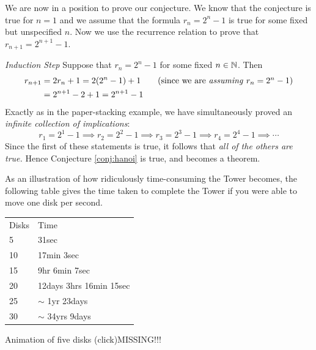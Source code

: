 We are now in a position to prove our conjecture. We know that the conjecture is true for $n=1$ and we assume that the formula $r_n=2^n-1$ is true for some fixed but unspecified $n$. Now we use the recurrence relation to prove that $r_{n+1}=2^{n+1}-1$.\smallbreak

\emph{Induction Step} Suppose that $r_n=2^n-1$ for some fixed $n\in\mathbb{N}$. Then
\begin{align*}
	r_{n+1}&=2r_n+1=2(2^n-1)+1\tag*{(since we are \emph{assuming} $r_n=2^n-1$)}\\
	&=2^{n+1}-2+1=2^{n+1}-1
\end{align*}
Exactly as in the paper-stacking example, we have simultaneously proved an \emph{infinite collection of implications}:
\[
	r_1=2^1-1\implies r_2=2^2-1\implies r_3=2^3-1\implies r_4=2^4-1\implies \cdots
\]
Since the first of these statements is true, it follows that \emph{all of the others are true.} Hence Conjecture \ref{conj:hanoi} is true, and becomes a theorem.\par

As an illustration of how ridiculously time-consuming the Tower becomes, the following table gives the time taken to complete the Tower if you were able to move one disk per second.

\begin{center}
	\begin{minipage}{0.4\textwidth}
		\begin{tabular}{ll}
			Disks&Time\\
			5&31sec\\
			10&17min 3sec\\
			15&9hr 6min 7sec\\
			20&12days 3hrs 16min 15sec\\
			25&$\sim$ 1yr 23days\\
			30&$\sim$ 34yrs 9days
		\end{tabular}
	\end{minipage}
	\begin{minipage}{0.55\textwidth}
	\centering

Animation of five disks (click)MISSING!!!
	\end{minipage}
\end{center}


